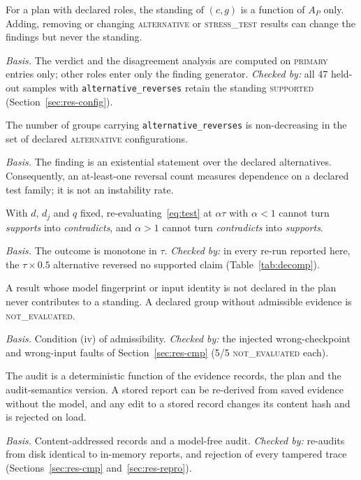 \begin{proposition}
\label{prop:roles}
For a plan with declared roles, the standing of $(c,g)$ is a function of $A_P$ only. Adding, removing or changing \textsc{alternative} or \textsc{stress\_test} results can change the findings but never the standing.
\end{proposition}
\emph{Basis.} The verdict and the disagreement analysis are computed on \textsc{primary} entries only; other roles enter only the finding generator. \emph{Checked by:} all 47 held-out samples with \texttt{alternative\_reverses} retain the standing \textsc{supported} (Section~\ref{sec:res-config}).

\begin{proposition}
\label{prop:mono}
The number of groups carrying \texttt{alternative\_reverses} is non-decreasing in the set of declared \textsc{alternative} configurations.
\end{proposition}
\emph{Basis.} The finding is an existential statement over the declared alternatives. Consequently, an at-least-one reversal count measures dependence on a declared test family; it is not an instability rate.

\begin{proposition}
\label{prop:thr}
With $d$, $d_j$ and $q$ fixed, re-evaluating~\eqref{eq:test} at $\alpha\tau$ with $\alpha<1$ cannot turn \emph{supports} into \emph{contradicts}, and $\alpha>1$ cannot turn \emph{contradicts} into \emph{supports}.
\end{proposition}
\emph{Basis.} The outcome is monotone in $\tau$. \emph{Checked by:} in every re-run reported here, the $\tau\times0.5$ alternative reversed no supported claim (Table~\ref{tab:decomp}).

\begin{proposition}
\label{prop:prov}
A result whose model fingerprint or input identity is not declared in the plan never contributes to a standing. A declared group without admissible evidence is \textsc{not\_evaluated}.
\end{proposition}
\emph{Basis.} Condition (iv) of admissibility. \emph{Checked by:} the injected wrong-checkpoint and wrong-input faults of Section~\ref{sec:res-cmp} (5/5 \textsc{not\_evaluated} each).

\begin{proposition}[Re-derivability]
\label{prop:det}
The audit is a deterministic function of the evidence records, the plan and the audit-semantics version. A stored report can be re-derived from saved evidence without the model, and any edit to a stored record changes its content hash and is rejected on load.
\end{proposition}
\emph{Basis.} Content-addressed records and a model-free audit. \emph{Checked by:} re-audits from disk identical to in-memory reports, and rejection of every tampered trace (Sections~\ref{sec:res-cmp} and~\ref{sec:res-repro}).
